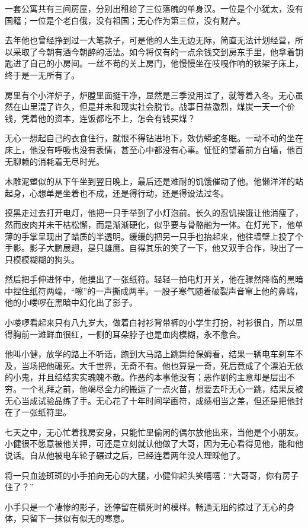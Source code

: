 一套公寓共有三间房屋，分别出租给了三位落魄的单身汉。一位是个小犹太，没有国籍；一位是个老白俄，没有祖国；无心作为第三位，没有财产。

去年他也曾经挣到过一大笔款子，可是他的人生无边无际，简直无法计划经营，所以采取了今朝有酒今朝醉的活法。如今将仅有的一点余钱交到房东手里，他拿着钥匙进了自己的小房间。一丝不苟的关上房门，他慢慢坐在吱嘎作响的铁架子床上，终于是一无所有了。

房里有个小洋炉子，炉膛里面挺干净，显然是三季没用过了，就等着入冬。无心虽然在山里混了许久，但是并未和现实社会脱节。战事日益激烈，煤炭一天一个价钱，凭着他的资本，连饭都吃不上，怎会有钱买煤？

无心一想起自己的衣食住行，就恨不得钻进地下，效仿蟒蛇冬眠。一动不动的坐在床上，他没有呼吸也没有表情，甚至心中都没有心事。怔怔的望着前方白墙，他百无聊赖的消耗着无尽时光。

木雕泥塑似的从下午坐到翌日晚上，最后还是难耐的饥饿催动了他。他懒洋洋的站起身，心想单是坐着也不成，还是得行动，还是得设法过冬。

摸黑走过去打开电灯，他把一只手举到了小灯泡前。长久的忍饥挨饿让他消瘦了，然而皮肉并未干枯松懈，而是渐渐硬化，似乎要与骨骼融为一体。在灯光下，他单薄的手掌呈现出了蜡质的半透明。缓缓的把另一只手也抬起来，他往墙壁上投了个手影。影子大鹏展翅，是只雄鹰。自得其乐的笑了一下，他又双手合作，映出了一只模模糊糊的狗头。

然后把手伸进怀中，他摸出了一张纸符。轻轻一拍电灯开关，他在骤然降临的黑暗中捏住纸符两端，``嚓''的一声撕成两半。一股子寒气随着破裂声音窜上他的鼻端，他的小喽啰在黑暗中幻化出了影子。

小喽啰看起来只有八九岁大，做着白衬衫背带裤的小学生打扮，衬衫很白，所以显得胸前一滩鲜血很红，一侧的耳朵脖子也是血肉模糊，永不愈合。

他叫小健，放学的路上不听话，跑到大马路上跳舞给保姆看，结果一辆电车刹车不及，当场把他碾死。大千世界，无奇不有。他也算是一奇，死后竟成了个漂泊无依的小鬼，并且结结实实魂魄不散。作恶的本事他没有；恶作剧的主意却是层出不穷。一个礼拜之前，他竭尽全力的搬运了一点火苗，想要去吓无心一跳，结果反被无心当成试验品练了手。无心花了十年时间学画符，成绩相当之差，但还是把他封在了一张纸符里。

七天之中，无心忙着找房安身，只能忙里偷闲的偶尔放他出来，当他是个小朋友。小健很不愿意被他关押，可还是立刻就认他做了大哥，因为无心看得见他，能和他说话。自从他被电车轮子碾过之后，已经连着两年没人理睬他了。

将一只血迹斑斑的小手拍向无心的大腿，小健仰起头笑嘻嘻：``大哥哥，你有房子住了？''

小手只是一个凄惨的影子，还停留在横死时的模样。畅通无阻的掠过了无心的身体，只留下一抹似有似无的寒意。

